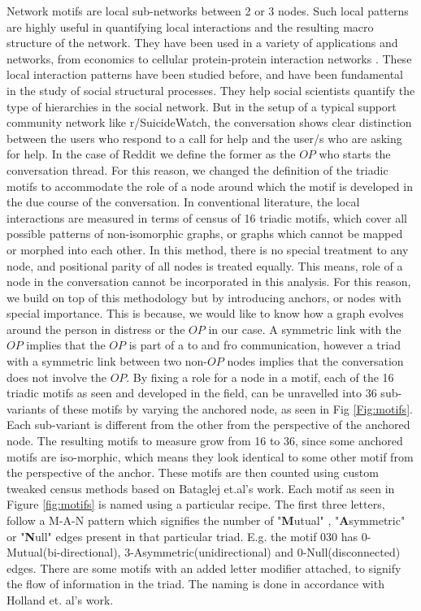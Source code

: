 Network motifs are local sub-networks between 2 or 3 nodes. Such local patterns are highly useful in quantifying local interactions and the resulting macro structure of the network\cite{milo2002network}. They have been used in a variety of applications and networks, from economics \cite{zhang2014dynamic} to cellular protein-protein interaction networks \cite{yeger2004network}. These local interaction patterns have been studied before, and have been fundamental in the study of social structural processes\cite{faust20077}. They help social scientists quantify the type of hierarchies in the social network\cite{davis1967clustering,davis1967structure}. 
But in the setup of a typical support community network like r/SuicideWatch, the conversation shows clear distinction between the users who respond to a call for help and the user/s who are asking for help. In the case of Reddit we define the former as the $OP$ who starts the conversation thread. For this reason, we changed the definition of the triadic motifs to accommodate the role of a node around which the motif is developed in the due course of the conversation. 
In conventional literature, the local interactions are measured in terms of census of 16 triadic motifs\cite{faust20077}, which cover all possible patterns of non-isomorphic graphs, or graphs which cannot be mapped or morphed into each other. In this method, there is no special treatment to any node, and positional parity of all nodes is treated equally. This means, role of a node in the conversation cannot be incorporated in this analysis. For this reason, we build on top of this methodology but by introducing anchors, or nodes with special importance. This is because, we would like to know how a graph evolves around the person in distress or the $OP$ in our case. A symmetric link with the $OP$ implies that the $OP$ is part of a to and fro communication, however a triad with a symmetric link between two non-$OP$ nodes implies that the conversation does not involve the $OP$. 
By fixing a role for a node in a motif, each of the 16 triadic motifs as seen and developed in the field\cite{faust20077, holland1977method}, can be unravelled into 36 sub-variants of these motifs by varying the anchored node, as seen in Fig \ref{Fig:motifs}. Each sub-variant is different from the other from the perspective of the anchored node. The resulting motifs to measure grow from 16 to 36, since some anchored motifs are iso-morphic, which means they look identical to some other motif from the perspective of the anchor. These motifs are then counted using custom tweaked census methods based on Bataglej et.al's work\cite{Batagelj2001}.
Each motif as seen in Figure \ref{fig:motifs} is named using a particular recipe. The first three letters, follow a M-A-N pattern which signifies the number of "\textbf{M}utual" , "\textbf{A}symmetric" or "\textbf{N}ull" edges present in that particular triad. E.g. the motif 030 has 0-Mutual(bi-directional), 3-Asymmetric(unidirectional) and 0-Null(disconnected) edges. There are some motifs with an added letter modifier attached, to signify the flow of information in the triad. The naming is done in accordance with Holland et. al's work\cite{doi:10.1177/104649647100200201}.


